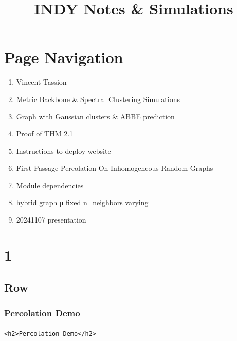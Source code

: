 \documentclass[
  letterpaper,
  DIV=11,
  numbers=noendperiod]{scrartcl}
\title{INDY Notes \& Simulations}
\author{}
\date{}
\makeatletter
\let\oldparagraph\paragraph
\renewcommand{\paragraph}{
    \@ifstar
      \xxxParagraphStar
      \xxxParagraphNoStar
  }
\newcommand{\xxxParagraphStar}[1]{\oldparagraph*{#1}\mbox{}}
\newcommand{\xxxParagraphNoStar}[1]{\oldparagraph{#1}\mbox{}}
\providecommand{\tightlist}{%
  \setlength{\itemsep}{0pt}\setlength{\parskip}{0pt}}\usepackage{longtable,booktabs,array}
\makeatother
\begin{document}
\maketitle


\section{Page Navigation}\label{page-navigation}

\begin{enumerate}
\def\labelenumi{\arabic{enumi}.}
\tightlist
\item
  Vincent Tassion
\item
  Metric Backbone \& Spectral Clustering Simulations
\item
  Graph with Gaussian clusters \& ABBE prediction
\item
  Proof of THM 2.1
\item
  Instructions to deploy website
\item
  First Passage Percolation On Inhomogeneous Random Graphs
\item
  Module dependencies
\item
  hybrid graph μ fixed n\_neighbors varying
\item
  20241107 presentation
\end{enumerate}

\section{1}\label{section}

\subsection{Row}\label{row}

\subsubsection{Percolation Demo}\label{percolation-demo}

\paragraph{}\label{section-1}

\label{input_selects_1}
\label{input_selects_1-1}
\begin{verbatim}
<h2>Percolation Demo</h2>
\end{verbatim}
\end{document}
